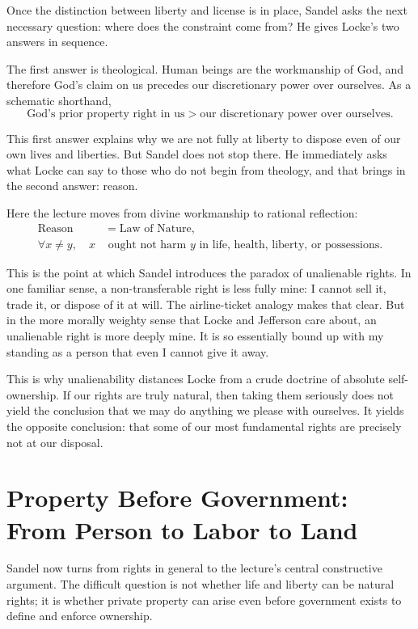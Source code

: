 Once the distinction between liberty and license is in place, Sandel asks the next necessary question: where does the constraint come from? He gives Locke's two answers in sequence.

The first answer is theological. Human beings are the workmanship of God, and therefore God's claim on us precedes our discretionary power over ourselves. As a schematic shorthand,
\begin{equation}
\text{God's prior property right in us} > \text{our discretionary power over ourselves}.
\end{equation}

This first answer explains why we are not fully at liberty to dispose even of our own lives and liberties. But Sandel does not stop there. He immediately asks what Locke can say to those who do not begin from theology, and that brings in the second answer: reason.

Here the lecture moves from divine workmanship to rational reflection:
\begin{align}
\text{Reason} &= \text{Law of Nature},\\
\forall x\neq y,\quad x &\text{ ought not harm } y \text{ in life, health, liberty, or possessions.}
\end{align}

This is the point at which Sandel introduces the paradox of unalienable rights. In one familiar sense, a non-transferable right is less fully mine: I cannot sell it, trade it, or dispose of it at will. The airline-ticket analogy makes that clear. But in the more morally weighty sense that Locke and Jefferson care about, an unalienable right is more deeply mine. It is so essentially bound up with my standing as a person that even I cannot give it away.

This is why unalienability distances Locke from a crude doctrine of absolute self-ownership. If our rights are truly natural, then taking them seriously does not yield the conclusion that we may do anything we please with ourselves. It yields the opposite conclusion: that some of our most fundamental rights are precisely not at our disposal.

\section{Property Before Government: From Person to Labor to Land}

Sandel now turns from rights in general to the lecture's central constructive argument. The difficult question is not whether life and liberty can be natural rights; it is whether private property can arise even before government exists to define and enforce ownership.

